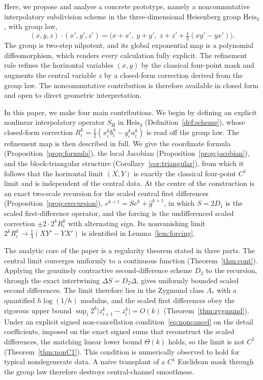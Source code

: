 \documentclass{article}
\theoremstyle{plain}
\theoremstyle{definition}
\newcommand{\Heis}{\mathrm{Heis}_3}
\newcommand{\SH}{S_{\mathrm{H}}}
\newcommand{\abs}[1]{\lvert #1 \rvert}
\begin{document}
Here, we propose and analyse a concrete prototype, namely a noncommutative
interpolatory subdivision scheme in the three-dimensional Heisenberg group
$\Heis$, with group law,
\begin{equation}\label{eq:grouplaw}
  (x,y,z)\cdot(x',y',z') = \bigl(x+x',\;y+y',\;z+z'+\tfrac{1}{2}(xy'-yx')\bigr).
\end{equation}
The group is two-step nilpotent, and its global exponential map is a
polynomial diffeomorphism, which renders every calculation fully explicit. The
refinement rule refines the horizontal variables $(x,y)$ by the classical
four-point mask and augments the central variable $z$ by a closed-form
correction derived from the group law. The noncommutative contribution is
therefore available in closed form and open to direct geometric interpretation.

In this paper, we make four main contributions. We begin by defining an explicit
nonlinear interpolatory operator $\SH$ in $\Heis$ (Definition~\ref{def:scheme}),
whose closed-form correction $R_i^k = \tfrac{1}{2}(x_i^k b_i^k - y_i^k a_i^k)$ is
read off the group law. The refinement map is then described in full. We give
the coordinate formula (Proposition~\ref{prop:formula}), the local Jacobian
(Proposition~\ref{prop:jacobian}), and the block-triangular structure
(Corollary~\ref{cor:triangular}), from which it follows that the horizontal
limit $(X,Y)$ is exactly the classical four-point $C^1$ limit and is independent
of the central data. At the centre of the construction is an exact two-scale
recursion for the scaled central first differences
(Proposition~\ref{prop:erecursion}), $e^{k+1}=S e^k+\hat g^{k+1}$, in which
$S=2D_1$ is the scaled first-difference operator, and the forcing is the
undifferenced scaled correction $\pm 2\cdot 2^k R_i^k$ with alternating sign. Its
nonvanishing limit $2^k R_i^k\to\tfrac14(XY'-YX')$ is identified in
Lemma~\ref{lem:forcing}.

The analytic core of the paper is a regularity theorem stated in three parts.
The central limit converges uniformly to a continuous function
(Theorem~\ref{thm:cont}). Applying the genuinely contractive second-difference
scheme $D_2$ to the recursion, through the exact intertwining
$\Delta S=D_2\Delta$, gives uniformly bounded scaled second differences. The
limit therefore lies in the Zygmund class $\Lambda_*$ with a quantified
$h\log(1/h)$ modulus, and the scaled first differences obey the rigorous upper
bound $\sup_i 2^k\abs{z_{i+1}^k-z_i^k}=O(k)$ (Theorem~\ref{thm:zygmund}). Under
an explicit signed non-cancellation condition~\eqref{eq:noncancel} on the detail
coefficients, imposed on the exact signed sums that reconstruct the scaled
differences, the matching linear lower bound $\Theta(k)$ holds, so the limit is
not $C^1$ (Theorem~\ref{thm:nonC1}). This condition is numerically observed to
hold for typical nondegenerate data. A naive transplant of a $C^1$ Euclidean
mask through the group law therefore destroys central-channel smoothness.
\end{document}
